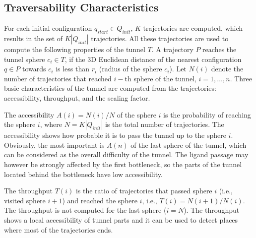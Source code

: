 \documentclass[letterpaper, 10 pt, conference]{ieeeconf} %
\def\qstart{q_{start}}
\def\qinit{\qstart}
\def\R{\mathbb{R}}
\def\QI{Q_{init}}
\begin{document}
\subsection{Traversability Characteristics}

For each initial configuration $\qinit \in \QI$, $K$ trajectories are computed, which results in the set of $K |\QI|$ trajectories.
All these trajectories are used to compute the following properties of the tunnel $T$.
A trajectory $P$ reaches the tunnel sphere $c_i \in T$, if the 3D Euclidean distance of the 
nearest configuration $q \in P$ towards $c_i$ is less than $r_i$ (radius of the sphere $c_i$).
Let $N(i)$ denote the number of trajectories that reached $i-$th sphere of the tunnel, $i=1,\ldots,n$.
Three basic characteristics of the tunnel are computed from the trajectories: accessibility, throughput, and the scaling factor.

The accessibility $A(i)=N(i)/N$ of the sphere $i$ is the probability of reaching the sphere $i$, where $N=K|\QI|$ is the total number of trajectories.
The accessibility shows how probable it is to pass the tunnel up to the sphere $i$.
Obviously, the most important is $A(n)$ of the last sphere of the tunnel, which can be considered as the overall difficulty of the tunnel.
The  ligand passage may however be strongly affected by the first bottleneck, so the parts of the tunnel located behind
the bottleneck have low accessibility.

The throughput $T(i)$ is the ratio of trajectories that passed sphere $i$ (i.e., visited sphere $i+1$) and reached the sphere $i$,
i.e., $T(i) = N(i+1) / N(i)$. 
The throughput is not computed for the last sphere ($i=N$).
The throughput shows a local accessibility of tunnel parts and it can be used to detect places where most of the trajectories ends.

\end{document}
